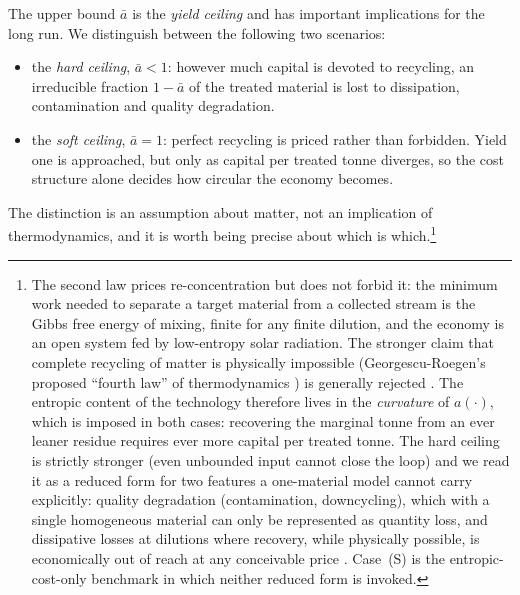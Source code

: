 The upper bound $\bar{a}$ is the \emph{yield ceiling} and has important implications for the long run. We distinguish between the following two scenarios:
\begin{itemize}
\item[(H)] the \emph{hard ceiling}, $\bar a<1$: however much capital is devoted to recycling, an irreducible fraction $1-\bar a$ of the treated material is lost to dissipation, contamination and quality degradation. 
\item[(S)] the \emph{soft ceiling}, $\bar a=1$: perfect recycling is priced rather than forbidden. Yield one is approached, but only as capital per treated tonne diverges, so the cost structure alone decides how circular the economy becomes.
\end{itemize}
The distinction is an assumption about matter, not an implication of thermodynamics, and it is worth being precise about which is which.\footnote{The second law prices re-concentration but does not forbid it: the minimum work needed to separate a target material from a collected stream is the Gibbs free energy of mixing, finite for any finite dilution, and the economy is an open system fed by low-entropy solar radiation. The stronger claim that complete recycling of matter is physically impossible (Georgescu-Roegen's proposed ``fourth law'' of thermodynamics \parencite{georgescu1971,georgescu1977}) is generally rejected \parencite{bianciardi1993,ayres1999}. The entropic content of the technology therefore lives in the \emph{curvature} of $a\left(\cdot\right)$, which is imposed in both cases: recovering the marginal tonne from an ever leaner residue requires ever more capital per treated tonne. The hard ceiling is strictly stronger (even unbounded input cannot close the loop) and we read it as a reduced form for two features a one-material model cannot carry explicitly: quality degradation (contamination, downcycling), which with a single homogeneous material can only be represented as quantity loss, and dissipative losses at dilutions where recovery, while physically possible, is economically out of reach at any conceivable price \parencite{reck2012,cullen2017}. Case~(S) is the entropic-cost-only benchmark in which neither reduced form is invoked.} 


